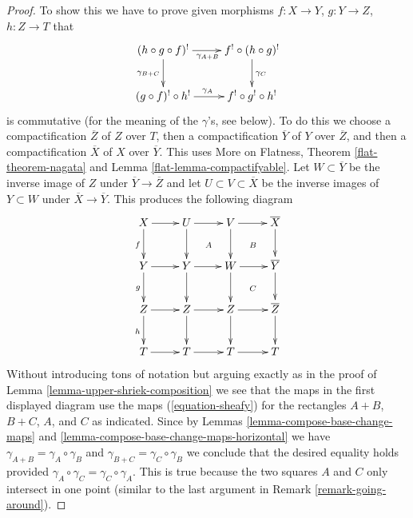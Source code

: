 \documentclass[10pt,a4paper]{amsart}
\theoremstyle{plain}
\theoremstyle{definition}
\theoremstyle{remark}
\numberwithin{equation}{subsection}
\begin{document}
\begin{proof}
To show this we have to prove given morphisms
$f : X \to Y$, $g : Y \to Z$, $h : Z \to T$
that
$$
\xymatrix{
(h \circ g \circ f)^! \ar[r]_{\gamma_{A + B}} \ar[d]_{\gamma_{B + C}} &
f^! \circ (h \circ g)^! \ar[d]^{\gamma_C} \\
(g \circ f)^! \circ h^! \ar[r]^{\gamma_A} & f^! \circ g^! \circ h^!
}
$$
is commutative (for the meaning of the $\gamma$'s, see below).
To do this we choose a compactification $\overline{Z}$
of $Z$ over $T$, then a compactification $\overline{Y}$ of $Y$ over
$\overline{Z}$, and then a compactification $\overline{X}$ of
$X$ over $\overline{Y}$. This uses
More on Flatness, Theorem \ref{flat-theorem-nagata} and
Lemma \ref{flat-lemma-compactifyable}.
Let $W \subset \overline{Y}$ be the inverse image of $Z$ under
$\overline{Y} \to \overline{Z}$ and let $U \subset V \subset \overline{X}$
be the inverse images of $Y \subset W$ under $\overline{X} \to \overline{Y}$.
This produces the following diagram
$$
\xymatrix{
X \ar[d]_f \ar[r] & U \ar[r] \ar[d] \ar@{}[dr]|A &
V \ar[d] \ar[r] \ar@{}[rd]|B & \overline{X} \ar[d] \\
Y \ar[d]_g \ar[r] & Y \ar[r] \ar[d] & W \ar[r] \ar[d] \ar@{}[rd]|C &
\overline{Y} \ar[d] \\
Z \ar[d]_h \ar[r] & Z \ar[d] \ar[r] & Z \ar[d] \ar[r] & \overline{Z} \ar[d] \\
T \ar[r] & T \ar[r] & T \ar[r] & T
}
$$
Without introducing tons of notation but arguing exactly
as in the proof of Lemma \ref{lemma-upper-shriek-composition}
we see that the maps in the first displayed diagram use the
maps (\ref{equation-sheafy}) for the rectangles
$A + B$, $B + C$, $A$, and $C$ as indicated. Since by
Lemmas \ref{lemma-compose-base-change-maps} and
\ref{lemma-compose-base-change-maps-horizontal}
we have $\gamma_{A + B} = \gamma_A \circ \gamma_B$ and
$\gamma_{B + C} = \gamma_C \circ \gamma_B$  we conclude
that the desired equality holds provided
$\gamma_A \circ \gamma_C = \gamma_C \circ \gamma_A$.
This is true because the two squares $A$ and $C$ only
intersect in one point (similar to the last argument in
Remark \ref{remark-going-around}).
\end{proof}
\end{document}
